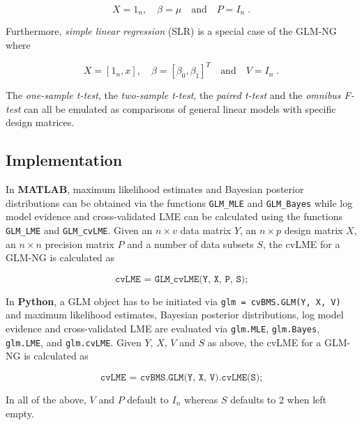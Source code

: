 \begin{equation} \label{eq:GLM-NG-UGuv}
X = 1_n,  \quad \beta = \mu \quad \text{and} \quad P = I_n \; .
\end{equation}

Furthermore, \textit{simple linear regression} (SLR) is a special case of the GLM-NG where

\begin{equation} \label{eq:GLM-NG-SLR}
X = [1_n, x],  \quad \beta = [\beta_0, \beta_1]^T \quad \text{and} \quad V = I_n \; .
\end{equation}

The \textit{one-sample t-test}, the \textit{two-sample t-test}, the \textit{paired t-test} and the \textit{omnibus F-test} can all be emulated as comparisons of general linear models with specific design matrices.


\subsection{Implementation} \label{sec:GLM-Imp}

In \textbf{MATLAB}, maximum likelihood estimates and Bayesian posterior distributions can be obtained via the functions \verb|GLM_MLE| and \verb|GLM_Bayes| while log model evidence and cross-validated LME can be calculated using the functions \verb|GLM_LME| and \verb|GLM_cvLME|. Given an $n \times v$ data matrix $Y$, an $n \times p$ design matrix $X$, an $n \times n$ precision matrix $P$ and a number of data subsets $S$, the cvLME for a GLM-NG is calculated as

\begin{equation} \label{eq:GLM-NG-cvLME-MATLAB}
\texttt{cvLME = GLM\_cvLME(Y, X, P, S);}
\end{equation}

In \textbf{Python}, a GLM object has to be initiated via \verb|glm = cvBMS.GLM(Y, X, V)| and maximum likelihood estimates, Bayesian posterior distributions, log model evidence and cross-validated LME are evaluated via \verb|glm.MLE|, \verb|glm.Bayes|, \verb|glm.LME|, and \verb|glm.cvLME|. Given $Y$, $X$, $V$ and $S$ as above, the cvLME for a GLM-NG is calculated as

\begin{equation} \label{eq:GLM-NG-cvLME-Python}
\texttt{cvLME = cvBMS.GLM(Y, X, V).cvLME(S);}
\end{equation}

In all of the above, $V$ and $P$ default to $I_n$ whereas $S$ defaults to 2 when left empty.